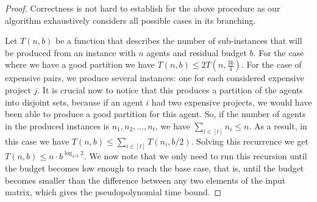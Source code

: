 \documentclass{article}
\begin{document}
\begin{proof}
Correctness is not hard to establish for the above procedure as our algorithm
exhaustively considers all possible cases in its branching. 

Let $T(n,b)$ be a function that describes the number
of sub-instances that will be produced from an instance with $n$ agents and
residual budget $b$. For the case where we have a good partition we have
$T(n,b)\le 2T(n,\frac{3b}{4})$. For the case of expensive pairs, we produce
several instances: one for each considered expensive project $j$. It is crucial
now to notice that this produces a partition of the agents into disjoint sets,
because if an agent $i$ had two expensive projects, we would have been able to
produce a good partition for this agent. So, if the number of agents in the
produced instances is $n_1,n_2,\ldots,n_t$, we have $\sum_{i\in [t]} n_i\le n$.
As a result, in this case we have $T(n,b)\le \sum_{i\in [t]} T(n_i,b/2)$. Solving
this recurrence we get $T(n,b)\le n\cdot b^{\log_{4/3} 2}$. We now note that we
only need to run this recursion until the budget becomes low enough to reach
the base case, that is, until the budget becomes smaller than the difference
between any two elements of the input matrix, which gives the pseudopolynomial
time bound. \end{proof}


\begin{comment}
Correctness is not hard to establish for the above procedure as our algorithm
exhaustively considers all possible cases in its branching. Let us then argue
regarding its complexity. Let $T(n,b)$ be a function that describes the number
of sub-instances that will be produced from an instance with $n$ agents and
residual budget $b$. For the case where we have a good partition we have
$T(n,b)\le 2T(n,\frac{3b}{4})$. For the case of expensive pairs, we produce
several instances: one for each considered expensive project $j$. It is crucial
now to notice that this produces a partition of the agents into disjoint sets,
because if an agent $i$ had two expensive projects, we would have been able to
produce a good partition for this agent. So, if the number of agents in the
produced instances is $n_1,n_2,\ldots,n_t$, we have $\sum_{i\in [t]} n_i\le n$.
As a result, in this case we have $T(n,b)\le \sum_{i\in [t]} T(n_i,b/2)$. Solving
this recurrence we get $T(n,b)\le n\cdot b^{\log_{4/3} 2}$. We now note that we
only need to run this recursion until the budget becomes low enough to reach
the base case, that is, until the budget becomes smaller than the difference
between any two elements of the input matrix, which gives the pseudopolynomial
time bound. 
\end{comment}
\end{document}
